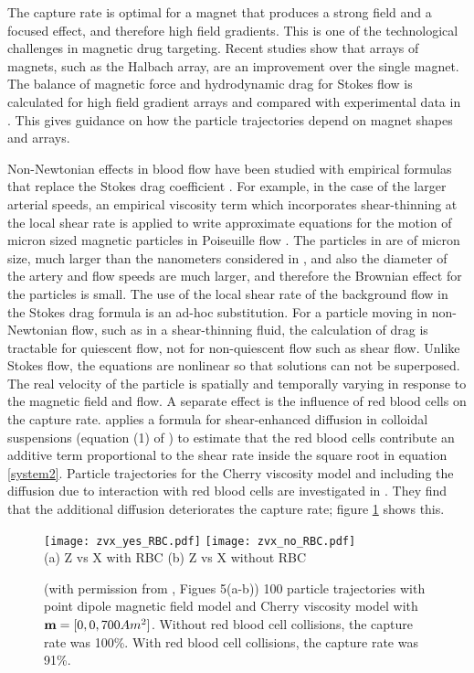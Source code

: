 The capture rate is optimal for a magnet that produces a strong field and a  focused effect, and therefore high field gradients. This is one of the technological challenges in magnetic drug targeting. Recent studies show that arrays of magnets, such as the Halbach array,  are an improvement over the single magnet. The balance of magnetic force and hydrodynamic drag for Stokes flow is calculated for high field gradient arrays and compared with experimental data in \cite{Barnsley2017}. This gives guidance on  how the particle trajectories depend on magnet shapes and arrays. 

Non-Newtonian effects in blood flow have been studied with  empirical formulas that replace the Stokes drag coefficient \cite{Sprenger2015}. For example,  in the case of  the larger arterial speeds,  an empirical viscosity term which incorporates shear-thinning at the local shear rate   is applied to  write approximate equations for the motion of  micron sized magnetic particles in Poiseuille flow \cite{Cherry2014,Mohren2017}.  The particles in \cite{Cherry2014} are of micron size, much larger than the nanometers considered in \cite{YLAR2012}, and also the diameter of the artery and flow speeds are much larger,  and therefore the Brownian effect for the particles is small.   The use of the local shear rate of the background  flow in the Stokes drag formula is an ad-hoc substitution.   For a particle moving in non-Newtonian flow, such as in a shear-thinning fluid,  the calculation of drag is tractable for quiescent flow,  not for non-quiescent flow such as shear flow. Unlike Stokes flow, the equations are nonlinear so that  solutions can not be superposed.  The real velocity of the particle is spatially and temporally varying in response to the magnetic field and flow.  
 A separate effect  is  the influence of  red blood cells on the capture rate.  \cite{Mohren2017} applies a  formula for shear-enhanced diffusion in colloidal suspensions (equation (1) of \cite{Griffiths2012})  to estimate that the red blood cells contribute an
   additive term proportional to the shear rate inside the square root in equation \ref{system2}.  Particle trajectories for the Cherry viscosity model and  including the diffusion due to interaction with red blood cells are investigated in \cite{Mohren2017}. They find that the additional diffusion deteriorates the capture rate; figure \ref{fig6} shows this. 
   

\begin{figure}[t]
\begin{center}
\texttt{[image: zvx\_yes\_RBC.pdf]}\hfil
\texttt{[image: zvx\_no\_RBC.pdf]}\\
\hfil (a) Z vs X with RBC \hfil (b) Z vs X without RBC\hfil \\
\end{center}
\caption{ (with permission from \cite{Mohren2017}, Figues 5(a-b)) 100 particle trajectories with point dipole magnetic field model and
Cherry viscosity model  with ${\bf m} =
[0, 0, 700Am^2]$. Without red blood cell collisions, the capture rate was 100\%. With red blood cell collisions, the capture rate was 91\%.}
\label{fig6}
\end{figure}

\FloatBarrier

